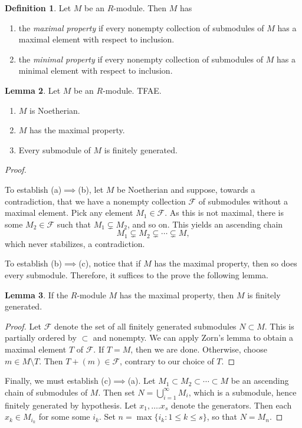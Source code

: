 \documentclass[10pt,letterpaper,cm]{nupset}
\theoremstyle{definition}
\newtheorem{definition}{Definition}[subsection]
\theoremstyle{theorem}
\newtheorem{lemma}[definition]{Lemma}
\theoremstyle{remark}
\newcommand{\1}{\mathbf{1}}
\newcommand{\0}{\vec 0}
\begin{document}
\begin{definition} Let $M$ be an $R$-module. Then $M$ has
\begin{enumerate}
\item the \textit{maximal property} if every nonempty collection of submodules of $M$ has a maximal element with respect to inclusion.
\item the \textit{minimal property} if every nonempty collection of submodules of $M$ has a minimal element with respect to inclusion.
\end{enumerate}
\end{definition}

\begin{lemma} Let $M$ be an $R$-module. TFAE.
\begin{enumerate}[label=(\alph*)]
\item $M$ is Noetherian.
\item $M$ has the maximal property. 
\item Every submodule of $M$ is finitely generated. 
\end{enumerate}
\end{lemma}
\begin{proof} $ $

\smallskip

To establish (a)$\implies$(b), let $M$ be Noetherian and suppose, towards a contradiction, that we have a nonempty collection $\mathcal{F}$ of submodules without a maximal element. Pick any element $M_1\in \mathcal{F}$. As this is not maximal, there is some $M_2\in \mathcal{F}$ such that $M_1 \subsetneq M_2$, and so on. This yields an ascending chain
\[
M_1 \subsetneq M_2\subsetneq \cdots \subsetneq M,
\]
which never stabilizes, a contradiction.

\smallskip

To establish (b)$\implies$(c), notice that if $M$ has the maximal property, then so does every submodule. Therefore, it suffices to the prove the following lemma.
\begin{lemma}\label{l19}
If the $R$-module $M$ has the maximal property, then $M$ is finitely generated.
\end{lemma}
\begin{proof}
Let $\mathcal{F}$ denote the set of all finitely generated submodules $N\subset M$. This is partially ordered by $\subset$ and nonempty. We can apply Zorn's lemma to obtain a maximal element $T$ of $\mathcal{F}$. If $T=M$, then we are done. Otherwise, choose $m\in M \setminus T$. Then $T + (m) \in \mathcal{F}$, contrary to our choice of $T$. 
\end{proof}

Finally, we must establish (c)$\implies$(a). Let $M_1 \subset M_2 \subset \cdots \subset M$ be an ascending chain of submodules of $M$. Then set $N= \bigcup_{i=1}^{\infty} M_i$, which is a submodule, hence finitely generated by hypothesis. Let $x_1, \ldots. x_s$ denote the generators. Then each $x_k \in M_{i_k}$ for some some $i_k$. Set $n= \max\{i_k : 1\leq k \leq s\}$, so that $N = M_n$.
\end{proof}
\end{document}
